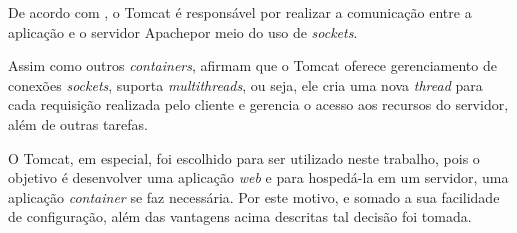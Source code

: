 \par De acordo com  , o Tomcat é responsável por realizar a comunicação entre a aplicação e o servidor Apache\footnotemark[19] por meio do uso de \textit{sockets}.


\par Assim como outros \textit{containers},  afirmam que o Tomcat oferece gerenciamento de conexões \textit{sockets}, suporta \textit{multithreads}, ou seja, ele cria uma nova \textit{thread} para cada requisição realizada pelo cliente e gerencia o acesso aos recursos do servidor, além de outras tarefas.

\par O Tomcat, em especial, foi escolhido para ser utilizado neste trabalho, pois o objetivo é desenvolver uma aplicação \textit{web} e para hospedá-la em um servidor, uma aplicação \textit{container} se faz necessária. Por este motivo, e somado a sua facilidade de configuração, além das vantagens acima descritas tal decisão foi tomada.
